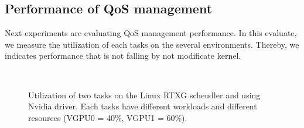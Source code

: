 %




\subsection{Performance of QoS management}
Next experiments are evaluating QoS management performance.
In this evaluate, we measure the utilization of each tasks on the several environments.
Thereby, we indicates performance that is not falling by not modificate kernel.
\begin{figure}[!t]
\begin{center}
\label{fig:fifo_rtx_nvidia} \\
\label{fig:band_rtx_nvidia}
\caption{Utilization of two tasks on the Linux RTXG scheudler and using Nvidia driver. Each tasks have different workloads and different resources (VGPU0 = 40\%, VGPU1 = 60\%).}
\label{fig:rtx_nvidia}
\end{center}
\end{figure}

